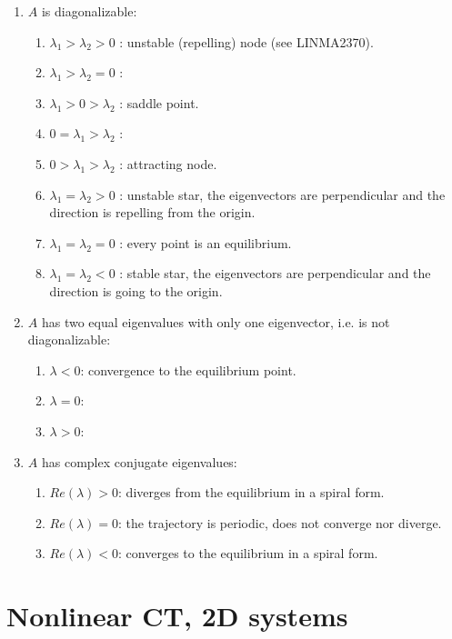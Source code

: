 \documentclass[12pt, openany]{report}
\theoremstyle{definition}
\begin{document}
\begin{enumerate}
    \item \(A\) is diagonalizable:
    \begin{enumerate}
        \item \(\lambda_1>\lambda_2>0\) : unstable (repelling) node (see LINMA2370).
        \item \(\lambda_1>\lambda_2=0\) : 
        \item \(\lambda_1>0>\lambda_2\) : saddle point.
        \item \(0=\lambda_1>\lambda_2\) : 
        \item \(0>\lambda_1>\lambda_2\) : attracting node.
        \item \(\lambda_1=\lambda_2>0\) : unstable star, the eigenvectors are perpendicular and the direction is repelling from the origin.
        \item \(\lambda_1=\lambda_2=0\) : every point is an equilibrium.
        \item \(\lambda_1=\lambda_2<0\) : stable star, the eigenvectors are perpendicular and the direction is going to the origin.
    \end{enumerate}
    \item \(A\) has two equal eigenvalues with only one eigenvector, i.e. is not diagonalizable:
    \begin{enumerate}
        \item \(\lambda<0\): convergence to the equilibrium point.
        \item \(\lambda=0\): 
        \item \(\lambda>0\):
    \end{enumerate}
    \item \(A\) has complex conjugate eigenvalues:
    \begin{enumerate}
        \item \(Re(\lambda)>0\): diverges from the equilibrium in a spiral form.
        \item \(Re(\lambda)=0\): the trajectory is periodic, does not converge nor diverge.
        \item \(Re(\lambda)<0\): converges to the equilibrium in a spiral form.
    \end{enumerate}
\end{enumerate}
\chapter{Nonlinear CT, 2D systems}
\end{document}
